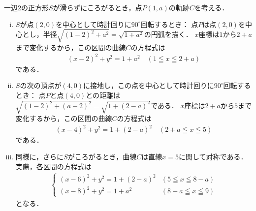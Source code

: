 \documentclass[../../main.tex]{subfiles}
\begin{document}
一辺$2$の正方形$S$が滑らずにころがるとき，点$P(1,a)$の軌跡$C$を考える．
\begin{enumerate}[(i)]
  \item $S$が点$(2,0)$を中心として時計回りに$90^\circ$回転するとき：
    点$P$は点$(2,0)$を中心とし，半径$\sqrt{(1-2)^2+a^2}=\sqrt{1+a^2}$の円弧を描く．
    $x$座標は$1$から$2+a$まで変化するから，この区間の曲線$C$の方程式は
    \begin{align}
      (x-2)^2+y^2=1+a^2 \quad (1 \leqq x \leqq 2+a) \label{eq:1}
    \end{align}
    である．
  \item $S$の次の頂点が$(4,0)$に接地し，この点を中心として時計回りに$90^\circ$回転するとき：
    点$P$と点$(4,0)$との距離は$\sqrt{(1-2)^2+(a-2)^2}=\sqrt{1+(2-a)^2}$である．
    $x$座標は$2+a$から$5$まで変化するから，この区間の曲線$C$の方程式は
    \begin{align}
      (x-4)^2+y^2=1+(2-a)^2 \quad (2+a \leqq x \leqq 5) \label{eq:2}
    \end{align}
    である．
  \item 同様に，さらに$S$がころがるとき，曲線$C$は直線$x=5$に関して対称である．
    実際，各区間の方程式は
    \begin{align}
      \begin{cases}
        (x-6)^2+y^2=1+(2-a)^2 & (5 \leqq x \leqq 8-a) \\
        (x-8)^2+y^2=1+a^2 & (8-a \leqq x \leqq 9)
      \end{cases} \label{eq:3}
    \end{align}
    となる．
\end{enumerate}
\end{document}
